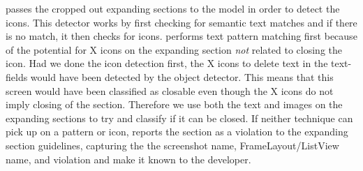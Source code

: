 \MotorEase passes the cropped out expanding sections to the model in order to detect the icons. 
This detector works by first checking for semantic text matches and if there is no match, it then checks for icons. \MotorEase performs text pattern matching first because of the potential for X icons on the expanding section \textit{not} related to closing the icon. Had we done the icon detection first, the X icons to delete text in the text-fields would have been detected by the object detector. This means that this screen would have been classified as closable even though the X icons do not imply closing of the section. Therefore we use both the text and images on the expanding sections to try and classify if it can be closed. 
If neither technique can pick up on a pattern or icon, \MotorEase reports the section as a violation to the expanding section guidelines, capturing the the screenshot name, FrameLayout/ListView name, and violation and make it known to the developer. %



